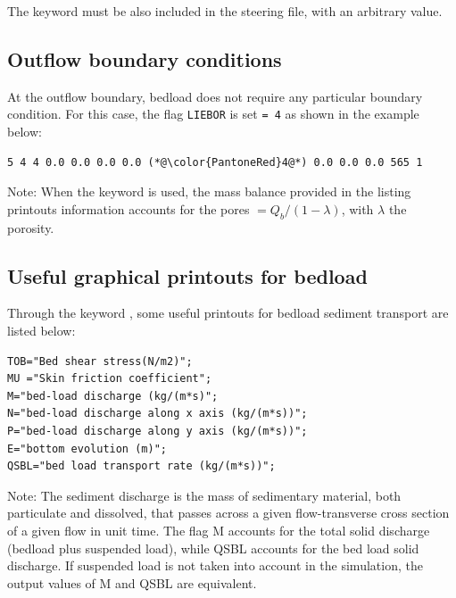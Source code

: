 The keyword  must be also included in the steering file, with an arbitrary value.

\subsection{Outflow boundary conditions}
At the outflow boundary, bedload does not require any particular boundary condition.
For this case, the flag \texttt{LIEBOR} is set \texttt{= 4} as shown in the example below:

\begin{lstlisting}[frame=trBL]
5 4 4 0.0 0.0 0.0 0.0 (*@\color{PantoneRed}4@*) 0.0 0.0 0.0 565 1
\end{lstlisting}

\begin{WarningBlock}{Note:}
When the keyword  is used, the mass balance provided in the listing printouts information accounts for the pores $=Q_b/(1-\lambda)$, with $\lambda$ the porosity.
\end{WarningBlock}

\subsection{Useful graphical printouts for bedload}
Through the keyword , some useful printouts for bedload sediment transport are listed below:
\begin{lstlisting}[frame=trBL]
TOB="Bed shear stress(N/m2)";
MU ="Skin friction coefficient";
M="bed-load discharge (kg/(m*s)";
N="bed-load discharge along x axis (kg/(m*s))";
P="bed-load discharge along y axis (kg/(m*s))";
E="bottom evolution (m)";
QSBL="bed load transport rate (kg/(m*s))";
\end{lstlisting}

\begin{WarningBlock}{Note:}
The sediment discharge is the mass of sedimentary material, both particulate and dissolved, that passes across a given flow-transverse cross section of a given flow in unit time. The flag {\ttfamily M} accounts for the total solid discharge (bedload plus suspended load), while {\ttfamily QSBL} accounts for the bed load solid discharge. If suspended load is not taken into account in the simulation, the output values of {\ttfamily M} and {\ttfamily QSBL} are equivalent.
\end{WarningBlock}
